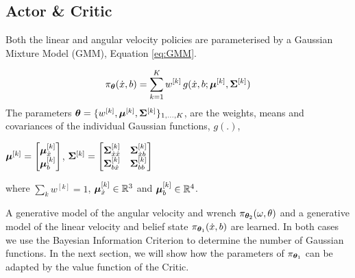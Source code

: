 \subsection{Actor \& Critic}
Both the linear and angular velocity policies are parameterised by a Gaussian Mixture Model (GMM), Equation \ref{eq:GMM}.

\begin{equation}
 \pi_{\boldsymbol{\theta}}(\dot{x},b) = \sum\limits_{k=1}^{K} w^{[k]} \, g(\dot{x},b;\boldsymbol{\mu}^{[k]},\boldsymbol{\Sigma}^{[k]}) \label{eq:GMM}
\end{equation}
The parameters $\boldsymbol{\theta} = \{w^{[k]},\boldsymbol{\mu}^{[k]},\boldsymbol{\Sigma}^{[k]}\}_{1,\dots,K}$, are the weights, means and covariances 
of the individual Gaussian functions, $g(.)$,
\begin{center}
$\boldsymbol{\mu}^{[k]} =  \begin{bmatrix} \boldsymbol{\mu}^{[k]}_{\dot{x}} \\ \boldsymbol{\mu}^{[k]}_{b} \end{bmatrix}$, 
$\boldsymbol{\Sigma}^{[k]} =  \begin{bmatrix} 
	  \boldsymbol{\Sigma}^{[k]}_{\dot{x}\dot{x}} & \boldsymbol{\Sigma}^{[k]}_{\dot{x}b} \\
	  \boldsymbol{\Sigma}^{[k]}_{b\dot{x}} & \boldsymbol{\Sigma}^{[k]}_{bb}
	  \end{bmatrix}$
\end{center}
where $\sum_{k} w^{[k]} = 1$, $\boldsymbol{\mu}^{[k]}_{\dot{x}} \in \mathbb{R}^{3}$ and  $\boldsymbol{\mu}^{[k]}_{b} \in \mathbb{R}^{4}$.

A generative model of the angular velocity and wrench $\pi_{\boldsymbol{\theta}_2}(\omega,\theta)$ and a generative model 
of the linear velocity and belief state $\pi_{\boldsymbol{\theta}_1}(\dot{x},b)$ are learned. 
In both cases we use the Bayesian Information Criterion to determine the number of Gaussian functions.
In the next section, we will show how the parameters of $\pi_{\boldsymbol{\theta}_1}$ can be adapted by the value function of the Critic.



